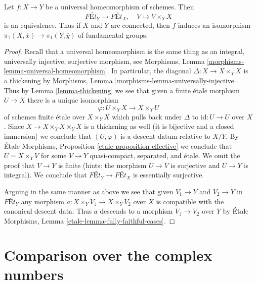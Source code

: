 \begin{proposition}
\label{proposition-universal-homeomorphism}
Let $f : X \to Y$ be a universal homeomorphism of schemes. Then
$$
\textit{F\'Et}_Y \longrightarrow \textit{F\'Et}_X,\quad
V \longmapsto V \times_Y X
$$
is an equivalence. Thus if $X$ and $Y$ are connected, then
$f$ induces an isomorphism $\pi_1(X, \overline{x}) \to \pi_1(Y, \overline{y})$
of fundamental groups.
\end{proposition}

\begin{proof}
Recall that a universal homeomorphism is the same thing as an
integral, universally injective, surjective morphism, see
Morphisms, Lemma \ref{morphisms-lemma-universal-homeomorphism}.
In particular, the diagonal $\Delta : X \to X \times_Y X$ is a thickening
by Morphisms, Lemma \ref{morphisms-lemma-universally-injective}.
Thus by Lemma \ref{lemma-thickening}
we see that given a finite \'etale morphism $U \to X$
there is a unique isomorphism
$$
\varphi : U \times_Y X \to X \times_Y U
$$
of schemes finite \'etale over $X \times_Y X$ which pulls back under
$\Delta$ to $\text{id} : U \to U$ over $X$.
Since $X \to X \times_Y X \times_Y X$
is a thickening as well (it is bijective and a closed immersion)
we conclude that $(U, \varphi)$ is a descent datum relative to $X/Y$.
By \'Etale Morphisms, Proposition \ref{etale-proposition-effective}
we conclude that $U = X \times_Y V$ for some $V \to Y$
quasi-compact, separated, and \'etale.
We omit the proof that $V \to Y$ is finite (hints:
the morphism $U \to V$ is surjective and $U \to Y$ is integral).
We conclude that $\textit{F\'Et}_Y \to \textit{F\'Et}_X$
is essentially surjective.

\medskip\noindent
Arguing in the same manner as above we see that given
$V_1 \to Y$ and $V_2 \to Y$ in $\textit{F\'Et}_Y$ any
morphism $a : X \times_Y V_1 \to X \times_Y V_2$ over $X$
is compatible with the canonical descent data. Thus $a$
descends to a morphism $V_1 \to V_2$ over $Y$ by
\'Etale Morphisms, Lemma \ref{etale-lemma-fully-faithful-cases}.
\end{proof}










\section{Comparison over the complex numbers}
\label{section-comparison-complex}

